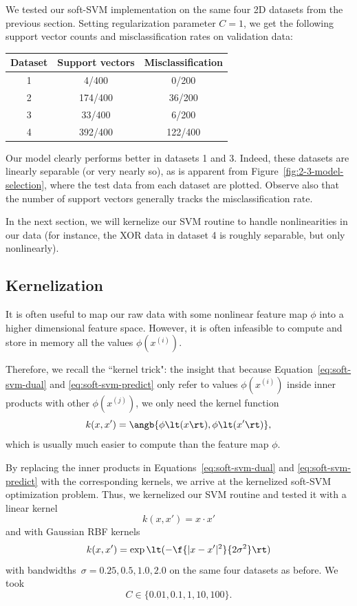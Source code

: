 \documentclass{article}
\newcommand{\sind}[1]{^{(#1)}}
\begin{document}
\begin{multicols}{2}
We tested our soft-SVM implementation
on the same four 2D datasets from the previous section.
Setting regularization parameter $C=1$,
we get the following support vector counts
and misclassification rates on validation data:

\begin{center}
\begin{tabular}{|c|c|c|}
\hline
Dataset & Support vectors & Misclassification \\\hline
1 & 4/400 & 0/200 \\
2 & 174/400 & 36/200 \\
3 & 33/400 & 6/200 \\
4 & 392/400 & 122/400\\\hline
\end{tabular}
\end{center}

Our model clearly performs better in datasets 1 and 3.
Indeed, these datasets are linearly separable (or very nearly so),
as is apparent from Figure~\ref{fig:2-3-model-selection},
where the test data from each dataset are plotted.
Observe also that the number of support vectors
generally tracks the misclassification rate.

In the next section, we will kernelize our SVM routine
to handle nonlinearities in our data
(for instance, the XOR data in dataset 4 is roughly separable, but only nonlinearly).

\subsection{Kernelization}
\label{subsec:kernelization}

It is often useful to map our raw data
with some nonlinear feature map $\phi$
into a higher dimensional feature space.
However, it is often infeasible to compute and store in memory
all the values $\phi(x\sind{i})$.

Therefore, we recall the ``kernel trick": the insight that
because Equation~\ref{eq:soft-svm-dual} and \ref{eq:soft-svm-predict}
only refer to values $\phi(x\sind{i})$ inside inner products
with other $\phi(x\sind{j})$,
we only need the kernel function
\begin{equation}
    k(x, x') = \angb{\phi\lt(x\rt), \phi\lt(x'\rt)},
\end{equation}
which is usually much easier to compute than the feature map $\phi$.

By replacing the inner products in
Equations~\ref{eq:soft-svm-dual} and \ref{eq:soft-svm-predict}
with the corresponding kernels,
we arrive at the kernelized soft-SVM optimization problem.
Thus, we kernelized our SVM routine
and tested it with a linear kernel
\begin{equation}
    k(x, x') = x\cdot x'
\end{equation}
and with Gaussian RBF kernels
\begin{equation}\label{eq:2-2-gaussian-rbf}
    k(x, x') = \exp\lt(-\f{|x - x'|^2}{2\sigma^2}\rt)
\end{equation}
with bandwidths~$\sigma=0.25,0.5,1.0,2.0$ on the same four datasets as before.
We took
\[
    C \in \{0.01, 0.1, 1, 10, 100\}.
\]


\end{multicols}
\end{document}
